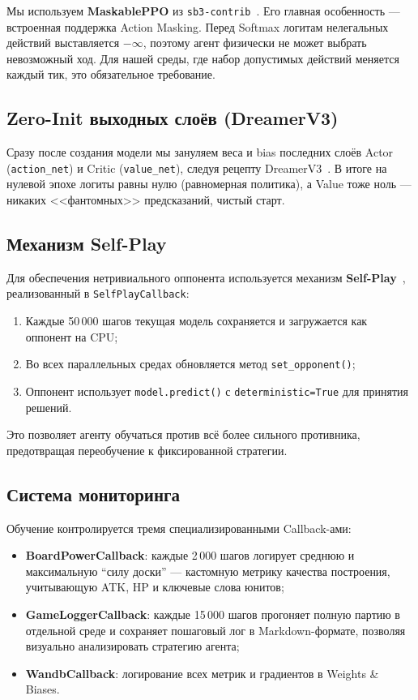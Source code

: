 \documentclass[a4paper,12pt]{extarticle}
\begin{document}
Мы используем \textbf{MaskablePPO} из \texttt{sb3-contrib}~\cite{vieira2022}. Его главная особенность --- встроенная поддержка Action Masking. Перед Softmax логитам нелегальных действий выставляется $-\infty$, поэтому агент физически не может выбрать невозможный ход. Для нашей среды, где набор допустимых действий меняется каждый тик, это обязательное требование.

\subsection{Zero-Init выходных слоёв (DreamerV3)}

Сразу после создания модели мы зануляем веса и bias последних слоёв Actor (\texttt{action\_net}) и Critic (\texttt{value\_net}), следуя рецепту DreamerV3~\cite{dreamerv3}. В итоге на нулевой эпохе логиты равны нулю (равномерная политика), а Value тоже ноль --- никаких <<фантомных>> предсказаний, чистый старт.

\subsection{Механизм Self-Play}

Для обеспечения нетривиального оппонента используется механизм \textbf{Self-Play}~\cite{alphastar}, реализованный в \texttt{SelfPlayCallback}:

\begin{enumerate}[noitemsep]
  \item Каждые 50\,000 шагов текущая модель сохраняется и загружается как оппонент на CPU;
  \item Во всех параллельных средах обновляется метод \texttt{set\_opponent()};
  \item Оппонент использует \texttt{model.predict()} с \texttt{deterministic=True} для принятия решений.
\end{enumerate}

Это позволяет агенту обучаться против всё более сильного противника, предотвращая переобучение к фиксированной стратегии.

\subsection{Система мониторинга}

Обучение контролируется тремя специализированными Callback-ами:

\begin{itemize}[noitemsep]
  \item \textbf{BoardPowerCallback}: каждые 2\,000 шагов логирует среднюю и максимальную ``силу доски'' --- кастомную метрику качества построения, учитывающую ATK, HP и ключевые слова юнитов;
  \item \textbf{GameLoggerCallback}: каждые 15\,000 шагов прогоняет полную партию в отдельной среде и сохраняет пошаговый лог в Markdown-формате, позволяя визуально анализировать стратегию агента;
  \item \textbf{WandbCallback}: логирование всех метрик и градиентов в Weights \& Biases.
\end{itemize}
\end{document}
